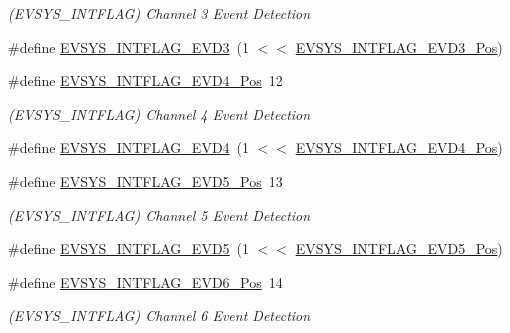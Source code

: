 \begin{DoxyCompactItemize}
\begin{DoxyCompactList}\small\item\em (E\+V\+S\+Y\+S\+\_\+\+I\+N\+T\+F\+L\+AG) Channel 3 Event Detection \end{DoxyCompactList}\item 
\#define \mbox{\hyperlink{group___s_a_m_d21___e_v_s_y_s_gabfe3d79294684eb3f85d5807f016791f}{E\+V\+S\+Y\+S\+\_\+\+I\+N\+T\+F\+L\+A\+G\+\_\+\+E\+V\+D3}}~(1 $<$$<$ \mbox{\hyperlink{group___s_a_m_d21___e_v_s_y_s_gacd935ce4e2aa96ac822118c7f1f1575d}{E\+V\+S\+Y\+S\+\_\+\+I\+N\+T\+F\+L\+A\+G\+\_\+\+E\+V\+D3\+\_\+\+Pos}})
\item 
\#define \mbox{\hyperlink{group___s_a_m_d21___e_v_s_y_s_ga9b521a6adbb5c67bd0dc64d43785fd92}{E\+V\+S\+Y\+S\+\_\+\+I\+N\+T\+F\+L\+A\+G\+\_\+\+E\+V\+D4\+\_\+\+Pos}}~12
\begin{DoxyCompactList}\small\item\em (E\+V\+S\+Y\+S\+\_\+\+I\+N\+T\+F\+L\+AG) Channel 4 Event Detection \end{DoxyCompactList}\item 
\#define \mbox{\hyperlink{group___s_a_m_d21___e_v_s_y_s_ga12635ab3aa48e2937829ebfb573d789f}{E\+V\+S\+Y\+S\+\_\+\+I\+N\+T\+F\+L\+A\+G\+\_\+\+E\+V\+D4}}~(1 $<$$<$ \mbox{\hyperlink{group___s_a_m_d21___e_v_s_y_s_ga9b521a6adbb5c67bd0dc64d43785fd92}{E\+V\+S\+Y\+S\+\_\+\+I\+N\+T\+F\+L\+A\+G\+\_\+\+E\+V\+D4\+\_\+\+Pos}})
\item 
\#define \mbox{\hyperlink{group___s_a_m_d21___e_v_s_y_s_ga87a15b7d456cac19fdf4851d04d12d56}{E\+V\+S\+Y\+S\+\_\+\+I\+N\+T\+F\+L\+A\+G\+\_\+\+E\+V\+D5\+\_\+\+Pos}}~13
\begin{DoxyCompactList}\small\item\em (E\+V\+S\+Y\+S\+\_\+\+I\+N\+T\+F\+L\+AG) Channel 5 Event Detection \end{DoxyCompactList}\item 
\#define \mbox{\hyperlink{group___s_a_m_d21___e_v_s_y_s_ga49b14643a55774ef1e4d5688b9fd1088}{E\+V\+S\+Y\+S\+\_\+\+I\+N\+T\+F\+L\+A\+G\+\_\+\+E\+V\+D5}}~(1 $<$$<$ \mbox{\hyperlink{group___s_a_m_d21___e_v_s_y_s_ga87a15b7d456cac19fdf4851d04d12d56}{E\+V\+S\+Y\+S\+\_\+\+I\+N\+T\+F\+L\+A\+G\+\_\+\+E\+V\+D5\+\_\+\+Pos}})
\item 
\#define \mbox{\hyperlink{group___s_a_m_d21___e_v_s_y_s_gaa3f1e6ade11523e9a2ae08c935ea568c}{E\+V\+S\+Y\+S\+\_\+\+I\+N\+T\+F\+L\+A\+G\+\_\+\+E\+V\+D6\+\_\+\+Pos}}~14
\begin{DoxyCompactList}\small\item\em (E\+V\+S\+Y\+S\+\_\+\+I\+N\+T\+F\+L\+AG) Channel 6 Event Detection \end{DoxyCompactList}\item 
$$
\end{DoxyCompactItemize}
